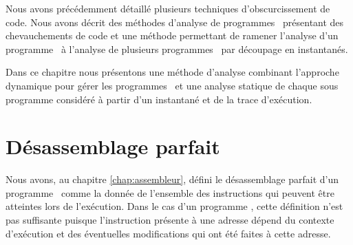 


Nous avons précédemment détaillé plusieurs techniques d'obscurcissement de code. 
Nous avons décrit des méthodes d'analyse de programmes \nsms\ présentant des chevauchements de code et une méthode permettant de ramener l'analyse d'un programme \sm\ à l'analyse de plusieurs programmes \nsms\ par découpage en instantanés.

Dans ce chapitre nous présentons une méthode d'analyse combinant l'approche dynamique pour gérer les programmes \sms\ et une analyse statique de chaque sous programme considéré à partir d'un instantané et de la trace d'exécution.

\section{Désassemblage parfait}
Nous avons, au chapitre \ref{chap:assembleur}, défini le désassemblage parfait d'un programme \nsm\ comme la donnée de l'ensemble des instructions qui peuvent être atteintes lors de l'exécution.
Dans le cas d'un programme \sm, cette définition n'est pas suffisante puisque l'instruction présente à une adresse dépend du contexte d'exécution et des éventuelles modifications qui ont été faites à cette adresse.

